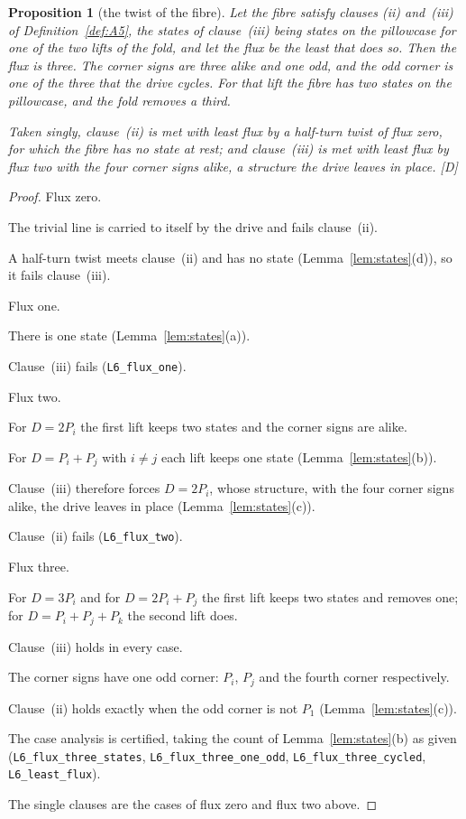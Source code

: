 \documentclass[11pt,a4paper]{article}
\theoremstyle{plain}
\newtheorem{proposition}[theorem]{Proposition}
\theoremstyle{definition}
\theoremstyle{remark}
\newcommand{\rigD}{[\textup{D}]}
\begin{document}
\begin{proposition}[the twist of the fibre]\label{prop:twist}
Let the fibre satisfy clauses (ii) and~(iii) of Definition~\ref{def:A5}, the states of clause~(iii) being states on the pillowcase for one of the two lifts of the fold, and let the flux be the least that does so. Then the flux is three. The corner signs are three alike and one odd, and the odd corner is one of the three that the drive cycles. For that lift the fibre has two states on the pillowcase, and the fold removes a third.

Taken singly, clause~(ii) is met with least flux by a half-turn twist of flux zero, for which the fibre has no state at rest; and clause~(iii) is met with least flux by flux two with the four corner signs alike, a structure the drive leaves in place. \rigD
\end{proposition}

\begin{proof}
Flux zero.

The trivial line is carried to itself by the drive and fails clause~(ii).

A half-turn twist meets clause~(ii) and has no state (Lemma~\ref{lem:states}(d)), so it fails clause~(iii).

Flux one.

There is one state (Lemma~\ref{lem:states}(a)).

Clause~(iii) fails (\texttt{L6\_flux\_one}).

Flux two.

For $D=2P_{i}$ the first lift keeps two states and the corner signs are alike.

For $D=P_{i}+P_{j}$ with $i\neq j$ each lift keeps one state (Lemma~\ref{lem:states}(b)).

Clause~(iii) therefore forces $D=2P_{i}$, whose structure, with the four corner signs alike, the drive leaves in place (Lemma~\ref{lem:states}(c)).

Clause~(ii) fails (\texttt{L6\_flux\_two}).

Flux three.

For $D=3P_{i}$ and for $D=2P_{i}+P_{j}$ the first lift keeps two states and removes one; for $D=P_{i}+P_{j}+P_{k}$ the second lift does.

Clause~(iii) holds in every case.

The corner signs have one odd corner: $P_{i}$, $P_{j}$ and the fourth corner respectively.

Clause~(ii) holds exactly when the odd corner is not $P_{1}$ (Lemma~\ref{lem:states}(c)).

The case analysis is certified, taking the count of Lemma~\ref{lem:states}(b) as given (\texttt{L6\_flux\_three\_states}, \texttt{L6\_flux\_three\_one\_odd}, \texttt{L6\_flux\_three\_cycled}, \texttt{L6\_least\_flux}).

The single clauses are the cases of flux zero and flux two above.
\end{proof}
\end{document}
